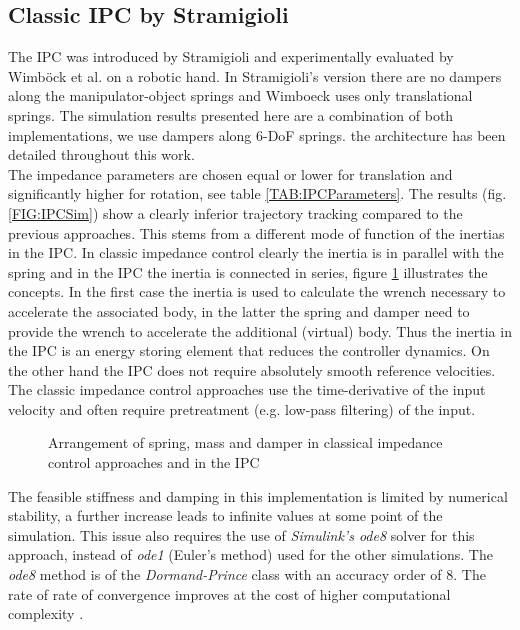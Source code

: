 \documentclass[a4paper,twoside, openright,12pt]{report}
\begin{document}
{\subsection{Classic IPC by Stramigioli}
The IPC was introduced by Stramigioli \cite{Stramigioli_01} and experimentally evaluated by Wimb\"ock et al. \cite{Wimboeck_08} on a robotic hand. In Stramigioli's version there are no dampers along the manipulator-object springs and Wimboeck uses only translational springs. The simulation results presented here are a combination of both implementations, we use dampers along 6-DoF springs. the architecture has been detailed throughout this work.\\
The impedance parameters are chosen equal or lower for translation and significantly higher for rotation, see table \ref{TAB:IPCParameters}. The results (fig. \ref{FIG:IPCSim}) show a clearly inferior trajectory tracking compared to the previous approaches. This stems from a different mode of function of the inertias in the IPC. In classic impedance control clearly the inertia is in parallel with the spring and in the IPC the inertia is connected in series, figure \ref{FIG:ImpedanceIPC} illustrates the concepts. In the first case the inertia is used to calculate the wrench necessary to accelerate the associated body, in the latter the spring and damper need to provide the wrench to accelerate the additional (virtual) body. Thus the inertia in the IPC is an energy storing element that reduces the controller dynamics. On the other hand the IPC does not require absolutely smooth reference velocities. The classic impedance control approaches use the time-derivative of the input velocity and often require pretreatment (e.g. low-pass filtering) of the input.\\
\begin{figure}[H]
	\centering
	\small
	\def\svgwidth{0.95\columnwidth}
	
	\caption{Arrangement of spring, mass and damper in classical impedance control approaches and in the IPC }
	\label{FIG:ImpedanceIPC}
\end{figure}
The feasible stiffness and damping in this implementation is limited by numerical stability, a further increase leads to infinite values at some point of the simulation. This issue also requires the use of \emph{Simulink's ode8} solver for this approach, instead of \emph{ode1} (Euler's method) used for the other simulations. The \emph{ode8} method is of the \emph{Dormand-Prince} class with an accuracy order of $8$. The rate of rate of convergence improves at the cost of higher computational complexity \cite{SimulinkHelp:Solver}. 




}
\end{document}
